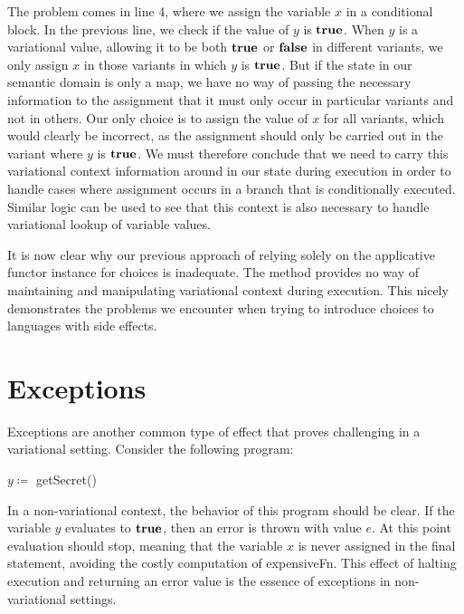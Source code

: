 \documentclass[12pt,oneside]{book}
\begin{document}
The problem comes in line 4, where we assign the variable $x$ in a conditional block. In the previous line, we check if the value of
$y$ is $\textbf{\textup{\textrm{true}}}$. When $y$ is a variational value, allowing it to be both $\textbf{\textup{\textrm{true}}}$ or $\textbf{\textup{\textrm{false}}}$ in different variants, we only assign $x$ in those variants
in which $y$ is $\textbf{\textup{\textrm{true}}}$. But if the state in our semantic domain is only a map, we have no way of passing the necessary information to the
assignment that it must only occur in particular variants and not in others. Our only choice is to assign the value of $x$ for all variants,
which would clearly be incorrect, as the assignment should only be carried out in the variant where $y$ is $\textbf{\textup{\textrm{true}}}$. We must therefore
conclude that we need to carry this variational context information around in our state during execution in order to handle cases where
assignment occurs in a branch that is conditionally executed. Similar logic can be used to see that this context is also necessary to handle
variational lookup of variable values.

It is now clear why our previous approach of relying solely on the applicative functor instance for choices is inadequate. The method provides
no way of maintaining and manipulating variational context during execution. This nicely demonstrates the problems we encounter when
trying to introduce choices to languages with side effects.

\section{Exceptions}
\label{sec:except}

Exceptions are another common type of effect that proves challenging in a variational setting.
Consider the following program:

\begin{samepage}
\begin{algorithmic}
\STATE $y \coloneqq$ getSecret()
\ENDIF
{}
\end{algorithmic}
\end{samepage}

In a non-variational context, the behavior of this program should be clear.
If the variable $y$ evaluates to $\textbf{\textup{\textrm{true}}}$, then an error is thrown with value
$e$. At this point evaluation should stop, meaning that the variable $x$ is never
assigned in the final statement, avoiding the costly computation of expensiveFn. This effect of halting execution and
returning an error value is the essence of exceptions in non-variational settings.
\end{document}

